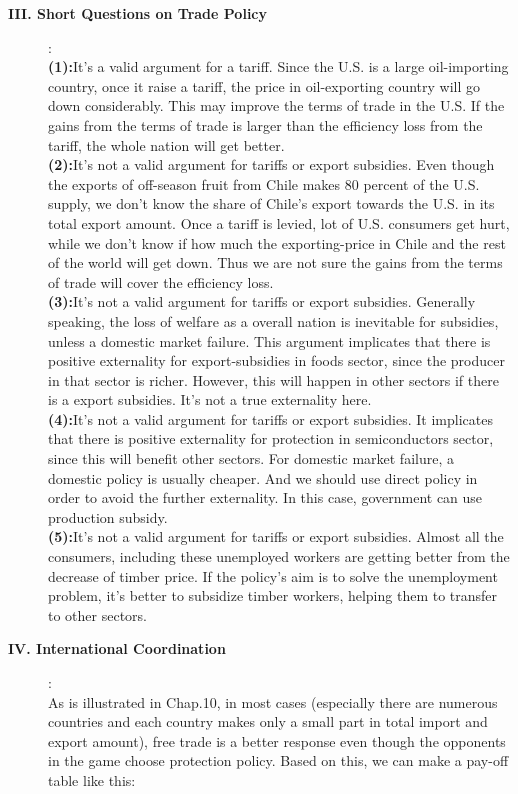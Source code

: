\documentclass{article}
\begin{document}
\begin{description}
    \item[{\bf III. Short Questions on Trade Policy}]:\\
    {\bf (1):}It's a valid argument for a tariff. Since the U.S. is a large oil-importing country, once it raise a tariff, the price in oil-exporting country will go down considerably. This may improve the terms of trade in the U.S. If the gains from the terms of trade is larger than the efficiency loss from the tariff, the whole nation will get better.\\
    {\bf (2):}It's not a valid argument for tariffs or export subsidies. Even though the exports of off-season fruit from Chile makes 80 percent of the U.S. supply, we don't know the share of Chile's export towards the U.S. in its total export amount. Once a tariff is levied, lot of U.S. consumers get hurt, while we don't know if how much the exporting-price in Chile and the rest of the world will get down. Thus we are not sure the gains from the terms of trade will cover the efficiency loss.\\
    {\bf (3):}It's not a valid argument for tariffs or export subsidies. Generally speaking, the loss of welfare as a overall nation is inevitable for subsidies, unless a domestic market failure. This argument implicates that there is positive externality for export-subsidies in foods sector, since the producer in that sector is richer. However, this will happen in other sectors if there is a export subsidies. It's not a true externality here.\\
    {\bf (4):}It's not a valid argument for tariffs or export subsidies. It implicates that there is positive externality for protection in semiconductors sector, since this will benefit other sectors. For domestic market failure, a domestic policy is usually cheaper. And we should use direct policy in order to avoid the further externality. In this case, government can use production subsidy.\\
    {\bf (5):}It's not a valid argument for tariffs or export subsidies. Almost all the consumers, including these unemployed workers are getting better from the decrease of timber price. If the policy's aim is to solve the unemployment problem, it's better to subsidize timber workers, helping them to transfer to other sectors.
    \item[{\bf IV. International Coordination}]:\\
    As is illustrated in Chap.10, in most cases (especially there are numerous countries and each country makes only a small part in total import and export amount), free trade is a better response even though the opponents in the game choose protection policy. Based on this, we can make a pay-off table like this:
    \begin{center}
\begin{tabular}{rrcc}


\end{tabular}
\end{center}
\end{description}
\end{document}
